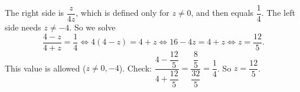 The right side is $\dfrac{z}{4z}$, which is defined only for $z\ne0$, and then equals $\dfrac{1}{4}$. The left side needs $z\ne-4$. So we solve
\[
\dfrac{4-z}{4+z}=\dfrac{1}{4}\iff 4(4-z)=4+z\iff 16-4z=4+z\iff z=\dfrac{12}{5}.
\]
This value is allowed ($z\ne0,-4$). Check: $\dfrac{4-\dfrac{12}{5}}{4+\dfrac{12}{5}}=\dfrac{\dfrac{8}{5}}{\dfrac{32}{5}}=\dfrac{1}{4}$. So $z=\boxed{\dfrac{12}{5}}$.
